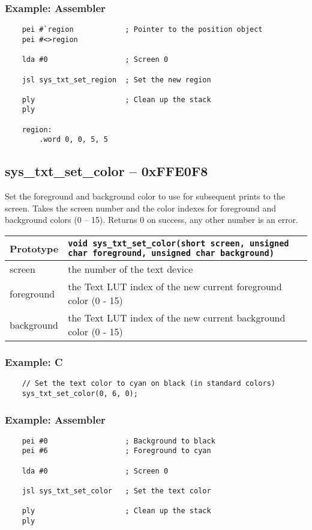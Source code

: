 \subsubsection*{Example: Assembler}
\begin{verbatim}
    pei #`region            ; Pointer to the position object
    pei #<>region

    lda #0                  ; Screen 0

    jsl sys_txt_set_region  ; Set the new region

    ply                     ; Clean up the stack
    ply

    region:
        .word 0, 0, 5, 5
\end{verbatim}

\subsection*{sys\_txt\_set\_color -- 0xFFE0F8}
Set the foreground and background color to use for subsequent prints to the screen.
Takes the screen number and the color indexes for foreground and background colors (0 -- 15).
Returns 0 on success, any other number is an error.

\bigskip

\begin{tabular}{|l||l|} \hline
Prototype & \lstinline!void sys_txt_set_color(short screen, unsigned char foreground, unsigned char background)! \\ \hline
screen & the number of the text device \\ \hline
foreground & the Text LUT index of the new current foreground color (0 - 15) \\ \hline
background & the Text LUT index of the new current background color (0 - 15) \\ \hline
\end{tabular}

\subsubsection*{Example: C}
\begin{lstlisting}
    // Set the text color to cyan on black (in standard colors)
    sys_txt_set_color(0, 6, 0);
\end{lstlisting}

\subsubsection*{Example: Assembler}
\begin{verbatim}
    pei #0                  ; Background to black
    pei #6                  ; Foreground to cyan

    lda #0                  ; Screen 0

    jsl sys_txt_set_color   ; Set the text color

    ply                     ; Clean up the stack
    ply
\end{verbatim}


